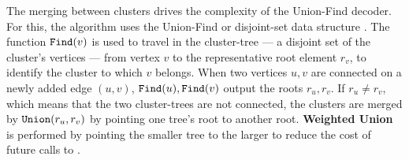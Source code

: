The merging between clusters drives the complexity of the Union-Find decoder. For this, the algorithm uses the Union-Find or disjoint-set data structure \cite{tarjan1975efficiency}. The function $\texttt{Find}(v)$ is used to travel in the cluster-tree --- a disjoint set of the cluster's vertices --- from vertex $v$ to the representative root element $r_v$, to identify the cluster to which $v$ belongs. When two vertices $u, v$ are connected on a newly added edge $(u,v)$, $\texttt{Find}(u), \texttt{Find}(v)$ output the roots $r_u, r_v$. If $r_u \neq r_v$, which means that the two cluster-trees are not connected, the clusters are merged by $\texttt{Union}(r_u, r_v)$ by pointing one tree's root to another root. \textbf{Weighted Union} is performed by pointing the smaller tree to the larger to reduce the cost of future calls to .